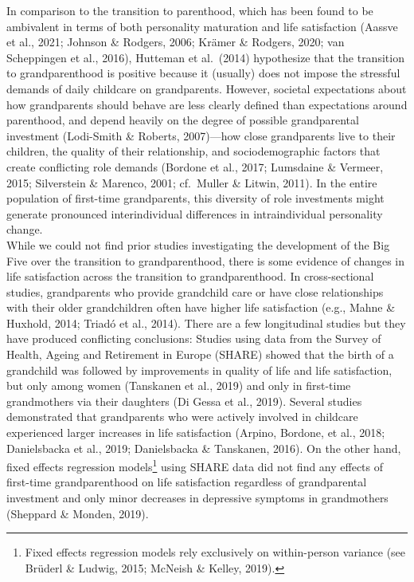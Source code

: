 \documentclass[
  english,
  man,floatsintext]{apa7}
\begin{document}
In comparison to the transition to parenthood, which has been found to be ambivalent in terms of both personality maturation and life satisfaction (Aassve et al., 2021; Johnson \& Rodgers, 2006; Krämer \& Rodgers, 2020; van Scheppingen et al., 2016), Hutteman et al.~(2014) hypothesize that the transition to grandparenthood is positive because it (usually) does not impose the stressful demands of daily childcare on grandparents. However, societal expectations about how grandparents should behave are less clearly defined than expectations around parenthood, and depend heavily on the degree of possible grandparental investment (Lodi-Smith \& Roberts, 2007)---how close grandparents live to their children, the quality of their relationship, and sociodemographic factors that create conflicting role demands (Bordone et al., 2017; Lumsdaine \& Vermeer, 2015; Silverstein \& Marenco, 2001; cf.~Muller \& Litwin, 2011). In the entire population of first-time grandparents, this diversity of role investments might generate pronounced interindividual differences in intraindividual personality change.\\
While we could not find prior studies investigating the development of the Big Five over the transition to grandparenthood, there is some evidence of changes in life satisfaction across the transition to grandparenthood. In cross-sectional studies, grandparents who provide grandchild care or have close relationships with their older grandchildren often have higher life satisfaction (e.g., Mahne \& Huxhold, 2014; Triadó et al., 2014). There are a few longitudinal studies but they have produced conflicting conclusions: Studies using data from the Survey of Health, Ageing and Retirement in Europe (SHARE) showed that the birth of a grandchild was followed by improvements in quality of life and life satisfaction, but only among women (Tanskanen et al., 2019) and only in first-time grandmothers via their daughters (Di Gessa et al., 2019). Several studies demonstrated that grandparents who were actively involved in childcare experienced larger increases in life satisfaction (Arpino, Bordone, et al., 2018; Danielsbacka et al., 2019; Danielsbacka \& Tanskanen, 2016). On the other hand, fixed effects regression models\footnote{Fixed effects regression models rely exclusively on within-person variance (see Brüderl \& Ludwig, 2015; McNeish \& Kelley, 2019).} using SHARE data did not find any effects of first-time grandparenthood on life satisfaction regardless of grandparental investment and only minor decreases in depressive symptoms in grandmothers (Sheppard \& Monden, 2019).\\
\end{document}
